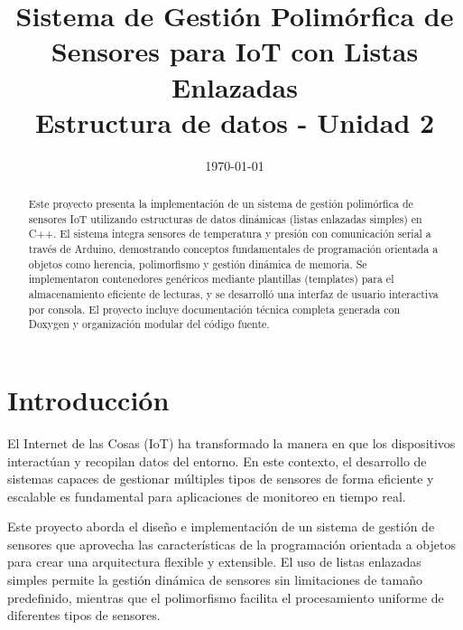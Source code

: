 \documentclass[conference]{IEEEtran}
\date{\specialdate\today}
\begin{document}
\newcommand{\breite}{1.0}
\newcommand{\RelacionFiguradoscolumnas}{0.9}
\newcommand{\RelacionFiguradoscolumnasPuntoCinco}{0.45}

\title{Sistema de Gestión Polimórfica de Sensores para IoT con Listas Enlazadas\\
\large Estructura de datos - Unidad 2}

\author{
}

\maketitle

\begin{abstract}
Este proyecto presenta la implementación de un sistema de gestión polimórfica de sensores IoT utilizando estructuras de datos dinámicas (listas enlazadas simples) en C++. El sistema integra sensores de temperatura y presión con comunicación serial a través de Arduino, demostrando conceptos fundamentales de programación orientada a objetos como herencia, polimorfismo y gestión dinámica de memoria. Se implementaron contenedores genéricos mediante plantillas (templates) para el almacenamiento eficiente de lecturas, y se desarrolló una interfaz de usuario interactiva por consola. El proyecto incluye documentación técnica completa generada con Doxygen y organización modular del código fuente.
\end{abstract}

\section{Introducción}

El Internet de las Cosas (IoT) ha transformado la manera en que los dispositivos interactúan y recopilan datos del entorno. En este contexto, el desarrollo de sistemas capaces de gestionar múltiples tipos de sensores de forma eficiente y escalable es fundamental para aplicaciones de monitoreo en tiempo real.

Este proyecto aborda el diseño e implementación de un sistema de gestión de sensores que aprovecha las características de la programación orientada a objetos para crear una arquitectura flexible y extensible. El uso de listas enlazadas simples permite la gestión dinámica de sensores sin limitaciones de tamaño predefinido, mientras que el polimorfismo facilita el procesamiento uniforme de diferentes tipos de sensores.
\end{document}
